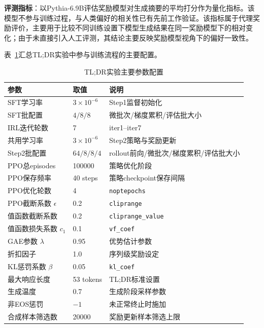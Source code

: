 \textbf{评测指标}：以Pythia-6.9B评估奖励模型对生成摘要的平均打分作为量化指标。该模型不参与训练过程，与人类偏好的相关性已有先前工作验证\cite{gao2023scaling}。该指标属于代理奖励评价，主要用于比较不同训练设置下模型生成结果在同一奖励模型下的相对变化；由于未直接引入人工评测，其结论主要反映奖励模型视角下的偏好一致性。

表~\ref{tab:hyperparams_tldr}汇总TL;DR实验中参与训练流程的主要配置。

\begin{table}[htbp]
    \centering
    \caption{TL;DR实验主要参数配置}
    \label{tab:hyperparams_tldr}
    \footnotesize
    \renewcommand{\arraystretch}{1.08}
    \setlength{\tabcolsep}{6pt}
    \begin{tabular*}{0.98\textwidth}{@{\extracolsep{\fill}}lll@{}}
        \toprule
        \textbf{参数} & \textbf{取值} & \textbf{说明} \\
        \midrule
        SFT学习率 & $3\times10^{-6}$ & Step1监督初始化 \\
        SFT批配置 & $4/8/8$ & 微批次/梯度累积/评估批大小 \\
        \midrule
        IRL迭代轮数 & 7 & iter1--iter7 \\
        共用学习率 & $3\times10^{-6}$ & Step2策略与奖励更新 \\
        Step2批配置 & $64/8/8/4$ & rollout前向/微批次/梯度累积/评估批大小 \\
        PPO总episodes & 100000 & 策略优化阶段 \\
        PPO保存频率 & 40 steps & 策略checkpoint保存间隔 \\
        PPO优化轮数 & 4 & \texttt{noptepochs} \\
        PPO截断系数 $\epsilon$ & 0.2 & \texttt{cliprange} \\
        值函数截断系数 & 0.2 & \texttt{cliprange\_value} \\
        值函数损失系数 $c_1$ & 0.1 & \texttt{vf\_coef} \\
        GAE参数 $\lambda$ & 0.95 & 优势估计参数 \\
        折扣因子 & 1.0 & 序列级奖励设定 \\
        KL惩罚系数 $\beta$ & 0.05 & \texttt{kl\_coef} \\
        最大响应长度 & 53 tokens & TL;DR标准设置 \\
        生成温度 & 0.7 & 生成阶段采样参数 \\
        非EOS惩罚 & $-1$ & 未正常终止时施加 \\
        \midrule
        合成样本筛选数 & 20000 & 奖励更新样本筛选上限 \\

\end{tabular*}
\end{table}
